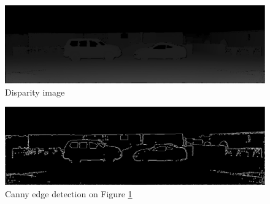 \begin{figure}[H]
\centering
\includegraphics[scale=0.35]{imggt5}
\caption{Disparity image}
\label{fig:imggt5}
\end{figure} 

\begin{figure}[H]
\centering
\includegraphics[scale=0.35]{mask5nodil}
\caption{Canny edge detection on Figure \protect\ref{fig:imggt5}}
\label{fig:edgenodil}
\end{figure} 

